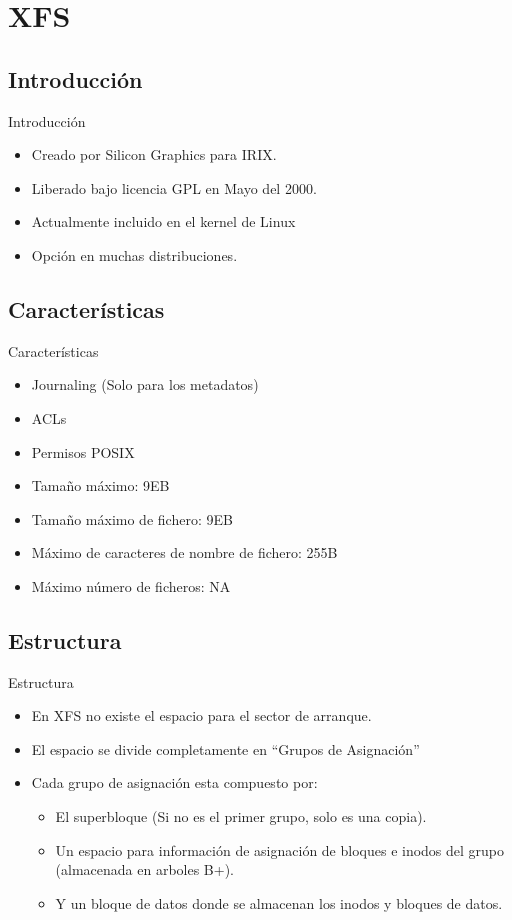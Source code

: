 \section{XFS}
\subsection{Introducción}
\begin{frame}{Introducción}
  \begin{itemize}
    \item Creado por Silicon Graphics para IRIX.
    \item Liberado bajo licencia GPL en Mayo del 2000.
    \item Actualmente incluido en el kernel de Linux
    \item Opción en muchas distribuciones.
  \end{itemize}
\end{frame}

\subsection{Características}
\begin{frame}{Características}
  \begin{itemize}
    \item Journaling (Solo para los metadatos)
    \item ACLs
    \item Permisos POSIX
    \item Tamaño máximo: 9EB
    \item Tamaño máximo de fichero: 9EB
    \item Máximo de caracteres de nombre de fichero: 255B
    \item Máximo número de ficheros: NA
  \end{itemize}
\end{frame}

\subsection{Estructura}
\begin{frame}{Estructura}
  \begin{itemize}
    \item En XFS no existe el espacio para el sector de arranque.
    \item El espacio se divide completamente en “Grupos de Asignación”
    \item Cada grupo de asignación esta compuesto por:
    \begin{itemize}
      \item El superbloque (Si no es el primer grupo, solo es una copia).
      \item Un espacio para información de asignación de bloques e inodos del grupo (almacenada en arboles B+).
      \item Y un bloque de datos donde se almacenan los inodos y bloques de datos.
    \end{itemize}
  \end{itemize}
\end{frame}

